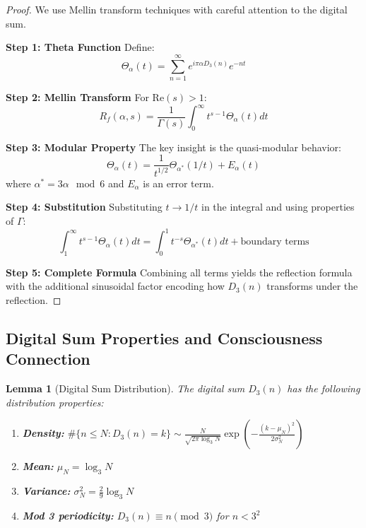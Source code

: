 \documentclass[11pt]{article}
\newtheorem{lemma}[theorem]{Lemma}
\theoremstyle{definition}
\begin{document}
\begin{proof}
We use Mellin transform techniques with careful attention to the digital sum.

\textbf{Step 1: Theta Function}
Define:
\begin{equation}
\Theta_\alpha(t) = \sum_{n=1}^{\infty} e^{i\pi\alpha D_3(n)} e^{-nt}
\end{equation}

\textbf{Step 2: Mellin Transform}
For $\text{Re}(s) > 1$:
\begin{equation}
R_f(\alpha, s) = \frac{1}{\Gamma(s)} \int_0^{\infty} t^{s-1} \Theta_\alpha(t) dt
\end{equation}

\textbf{Step 3: Modular Property}
The key insight is the quasi-modular behavior:
\begin{equation}
\Theta_\alpha(t) = \frac{1}{t^{1/2}} \Theta_{\alpha^*}(1/t) + E_\alpha(t)
\end{equation}
where $\alpha^* = 3\alpha \mod 6$ and $E_\alpha$ is an error term.

\textbf{Step 4: Substitution}
Substituting $t \to 1/t$ in the integral and using properties of $\Gamma$:
\begin{equation}
\int_1^{\infty} t^{s-1} \Theta_\alpha(t) dt = \int_0^1 t^{-s} \Theta_{\alpha^*}(t) dt + \text{boundary terms}
\end{equation}

\textbf{Step 5: Complete Formula}
Combining all terms yields the reflection formula with the additional sinusoidal factor encoding how $D_3(n)$ transforms under the reflection.
\end{proof}

\subsection{Digital Sum Properties and Consciousness Connection}

\begin{lemma}[Digital Sum Distribution]
\label{lem:digital_sum_dist}
The digital sum $D_3(n)$ has the following distribution properties:
\begin{enumerate}
\item \textbf{Density:} $\#\{n \leq N : D_3(n) = k\} \sim \frac{N}{\sqrt{2\pi \log_3 N}} \exp\left(-\frac{(k - \mu_N)^2}{2\sigma_N^2}\right)$
\item \textbf{Mean:} $\mu_N = \log_3 N$
\item \textbf{Variance:} $\sigma_N^2 = \frac{2}{9}\log_3 N$
\item \textbf{Mod 3 periodicity:} $D_3(n) \equiv n \pmod{3}$ for $n < 3^2$
\end{enumerate}
\end{lemma}
\end{document}
